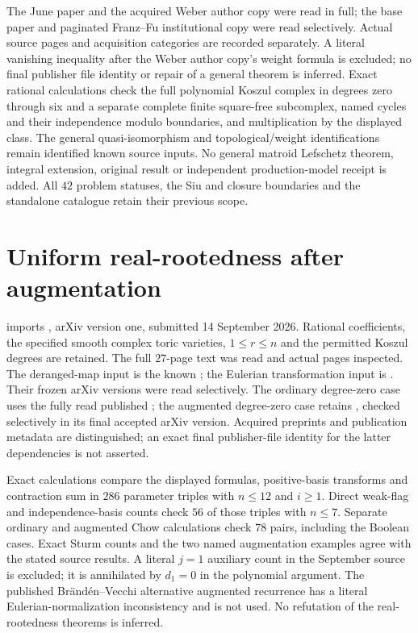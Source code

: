 The June paper and the acquired Weber author copy were read in full;
the base paper and paginated Franz--Fu institutional copy were read
selectively. Actual source pages and acquisition categories are
recorded separately. A literal vanishing inequality after the
Weber author copy's weight formula is excluded; no final publisher
file identity or repair of a general theorem is inferred. Exact
rational calculations check the full polynomial Koszul complex in
degrees zero through six and a separate complete finite square-free
subcomplex, named cycles and their independence modulo boundaries,
and multiplication by the displayed class. The general
quasi-isomorphism and topological/weight identifications remain
identified known source inputs. No general matroid Lefschetz
theorem, integral extension, original result or independent
production-model receipt is added. All $42$ problem statuses,
the Siu and closure boundaries and the standalone catalogue retain
their previous scope.

\section{Uniform real-rootedness after augmentation}
\label{sec:provenance-uniform-real-rootedness}

 imports
\cite[Theorems~1.3, 1.4 and~1.6, Definition~4.1,
Proposition~6.6 and Example~7.5]{BinderVecchi26AugmentedCohomology},
arXiv version one, submitted 14 September 2026. Rational
coefficients, the specified smooth complex toric varieties,
$1\le r\le n$ and the permitted Koszul degrees are retained.
The full $27$-page text was read and actual pages inspected.
The deranged-map input is the known
\cite[Corollary~3.7]{BrandenSolus21Symmetric}; the Eulerian
transformation input is \cite[Theorem~1.1]{Athanasiadis25Eulerian}.
Their frozen arXiv versions were read selectively. The ordinary
degree-zero case uses the fully read published
\cite[Theorem~1.1]{BrandenVecchi26UniformChow}; the augmented
degree-zero case retains \cite[Theorem~1.10]{FMSV24ChowSeries},
checked selectively in its final accepted arXiv version.
Acquired preprints and publication metadata are distinguished;
an exact final publisher-file identity for the latter dependencies
is not asserted.

Exact calculations compare the displayed formulas, positive-basis
transforms and contraction sum in $286$ parameter triples with
$n\le12$ and $i\ge1$. Direct weak-flag and independence-basis
counts check $56$ of those triples with $n\le7$. Separate ordinary
and augmented Chow calculations check $78$ pairs, including the
Boolean cases. Exact Sturm counts and the two named augmentation
examples agree with the stated source results. A literal $j=1$
auxiliary count in the September source is excluded; it is
annihilated by $d_1=0$ in the polynomial argument. The published
Br\"and\'en--Vecchi alternative augmented recurrence has a
literal Eulerian-normalization inconsistency and is not used.
No refutation of the real-rootedness theorems is inferred.

